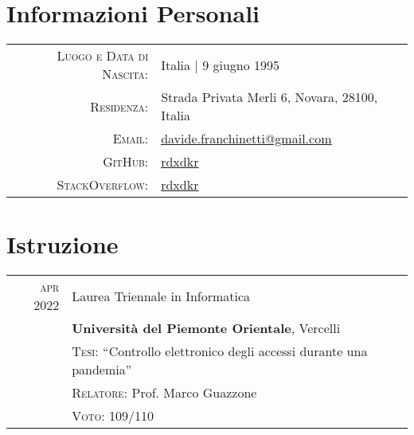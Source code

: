 \documentclass[a4paper,10pt]{article} %
\begin{document}
\pagestyle{empty} %


\par{\bigskip\par} %

\section{Informazioni Personali}

\begin{tabular}{rl}
\textsc{Luogo e Data di Nascita:} & Italia | 9 giugno 1995 \\
\textsc{Residenza:} & Strada Privata Merli 6, Novara, 28100, Italia \\
\textsc{Email:} & \href{mailto:davide.franchinetti@gmail.com}{\underline{davide.franchinetti@gmail.com}}\\
\textsc{GitHub:} & \href{https://github.com/rdxdkr}{\underline{rdxdkr}}\\
\textsc{StackOverflow:} & \href{https://stackoverflow.com/users/9212745/rdxdkr}{\underline{rdxdkr}}\\
\end{tabular}


\section{Istruzione}

\begin{tabular}{rl}	
\textsc{apr 2022} & Laurea Triennale in Informatica\\
& \textbf{Università del Piemonte Orientale}, Vercelli\\
& \textsc{Tesi:} ``Controllo elettronico degli accessi durante una pandemia''\\
& \small \textsc{Relatore:} Prof. Marco Guazzone\\
& \normalsize \textsc{Voto:} 109/110\\
\end{tabular}
\end{document}
